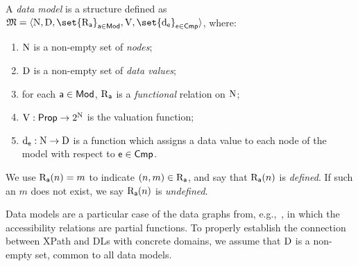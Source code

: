 \begin{definition} \label{def:model:xpath}
     A \emph{data model} is a structure defined as
     $\model = \tup{ \N, \D, \set{\R_{\apath}}_{\apath \in \mods}, \valuation,\set{\data_\cmp}_{\cmp \in \cmps} }$, where:
    \begin{enumerate}
        \item 
            $\mathrm{N}$ is a non-empty set of \emph{nodes};
        \item 
            $\mathrm{D}$ is a non-empty set of \emph{data values};
        \item 
            for each $\mathsf{a} \in \mathsf{Mod}$, $\mathrm{R}_{\mathsf{a}}$ is a \emph{functional} relation on $\mathrm{N}$;
        \item 
            $\operatorname{V}: \mathsf{Prop} \to 2^{\mathrm{N}}$ is the valuation function;
        \item 
            $\operatorname{d}_{\mathsf{e}}:  \mathrm{N} \to \mathrm{D}$ is a function which assigns a data value to each node of the model with respect to $\mathsf{e}\in\mathsf{Cmp}$.
    \end{enumerate}
    We use $\mathrm{R}_{\mathsf{a}}(n) = m$ to indicate $(n,m)\in\mathrm{R}_{\mathsf{a}}$, and say that $\mathrm{R}_{\mathsf{a}}(n)$ is \emph{defined}. If such an $m$ does not exist, we say  $\mathrm{R}_{\mathsf{a}}(n)$ is \emph{undefined}.
\end{definition}

Data models are a particular case of the data graphs from, e.g.,~\cite{ICDT14Jair}, in which the accessibility relations are partial functions. To properly establish the connection between XPath and DLs with concrete domains, we assume that $\mathrm{D}$ is a non-empty set, common to all data models.


